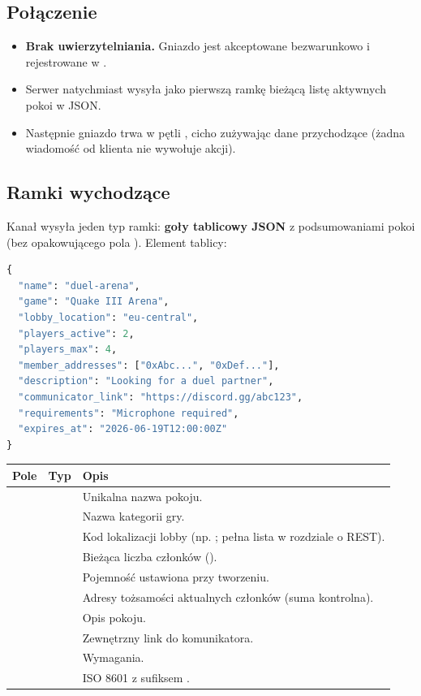 \subsection{Połączenie}

\begin{itemize}[nosep]
  \item \textbf{Brak uwierzytelniania.} Gniazdo jest akceptowane bezwarunkowo i rejestrowane w .
  \item Serwer natychmiast wysyła jako pierwszą ramkę bieżącą listę aktywnych pokoi w JSON.
  \item Następnie gniazdo trwa w pętli , cicho zużywając dane przychodzące (żadna wiadomość od klienta nie wywołuje akcji).
\end{itemize}

\subsection{Ramki wychodzące}

Kanał wysyła jeden typ ramki: \textbf{goły tablicowy JSON} z podsumowaniami pokoi (bez opakowującego
pola ). Element tablicy:

\begin{lstlisting}[language=Python]
{
  "name": "duel-arena",
  "game": "Quake III Arena",
  "lobby_location": "eu-central",
  "players_active": 2,
  "players_max": 4,
  "member_addresses": ["0xAbc...", "0xDef..."],
  "description": "Looking for a duel partner",
  "communicator_link": "https://discord.gg/abc123",
  "requirements": "Microphone required",
  "expires_at": "2026-06-19T12:00:00Z"
}
\end{lstlisting}

\begin{tabularx}{\textwidth}{llY}
\toprule
Pole & Typ & Opis \\
\midrule
{} &  & Unikalna nazwa pokoju. \\
 &  & Nazwa kategorii gry. \\
 &  & Kod lokalizacji lobby (np. ; pełna lista w rozdziale o REST). \\
 &  & Bieżąca liczba członków (). \\
 &  & Pojemność ustawiona przy tworzeniu. \\
 &  & Adresy tożsamości aktualnych członków (suma kontrolna). \\
 &  & Opis pokoju. \\
 &  & Zewnętrzny link do komunikatora. \\
 &  & Wymagania. \\
 &  & ISO 8601 z sufiksem . \\
\bottomrule
\end{tabularx}


